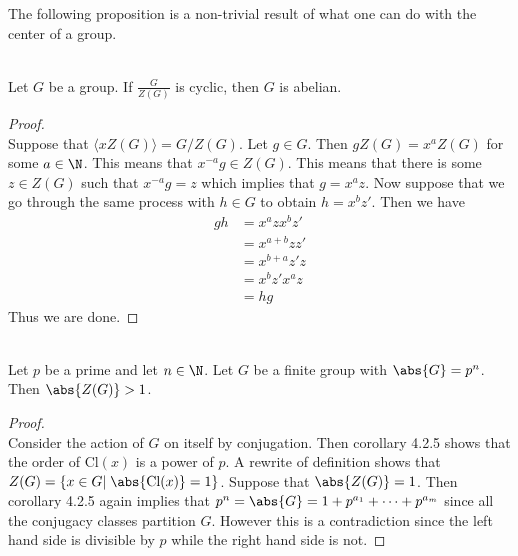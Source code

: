 \documentclass[a4paper]{article}
\begin{document}
The following proposition is a non-trivial result of what one can do with the center of a group. 

\begin{prp}{}{}\\
Let $G$ be a group. If $\frac{G}{Z(G)}$ is cyclic, then $G$ is abelian. 
\begin{proof}\\
Suppose that $\langle xZ(G)\rangle=G/Z(G)$. Let $g\in G$. Then $gZ(G)=x^aZ(G)$ for some $a\in\N$. This means that $x^{-a}g\in Z(G)$. This means that there is some $z\in Z(G)$ such that $x^{-a}g=z$ which implies that $g=x^az$. Now suppose that we go through the same process with $h\in G$ to obtain $h=x^bz'$. Then we have 
\begin{align*}
gh&=x^azx^bz'\\
&=x^{a+b}zz'\tag{$z\in Z(G)$}\\
&=x^{b+a}z'z\\
&=x^bz'x^az\\
&=hg
\end{align*}
Thus we are done. 
\end{proof}
\end{prp}

\begin{prp}{}{}\\
Let $p$ be a prime and let $n\in\N$. Let $G$ be a finite group with $\abs{G}=p^n$. Then $\abs{Z(G)}>1$. 
\begin{proof}\\
Consider the action of $G$ on itself by conjugation. Then corollary 4.2.5 shows that the order of $\text{Cl}(x)$ is a power of $p$. A rewrite of definition shows that $Z(G)=\{x\in G|\;\abs{\text{Cl}(x)}=1\}$. Suppose that $\abs{Z(G)}=1$. Then corollary 4.2.5 again implies that $p^n=\abs{G}=1+p^{a_1}+\dots+p^{a_m}$ since all the conjugacy classes partition $G$. However this is a contradiction since the left hand side is divisible by $p$ while the right hand side is not. 
\end{proof}
\end{prp}
\end{document}
